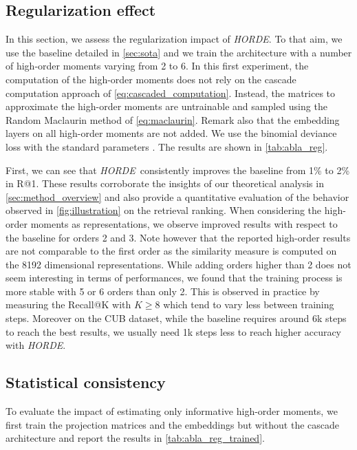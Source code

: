 \documentclass[10pt,twocolumn,letterpaper]{article}
\def\ourmethod{\textit{HORDE}}
\begin{document}
    \subsection{Regularization effect}\label{sec:abla_regul_power}
        In this section, we assess the regularization impact of \ourmethod.
        To that aim, we use the baseline detailed in \autoref{sec:sota} and we train the architecture with a number of high-order moments varying from 2 to 6.
        In this first experiment, the computation of the high-order moments does not rely on the cascade computation approach of \autoref{eq:cascaded_computation}.
        Instead, the matrices to approximate the high-order moments are untrainable and sampled using the Random Maclaurin method of \autoref{eq:maclaurin}.
        Remark also that the embedding layers on all high-order moments are not added.
        We use the binomial deviance loss with the standard parameters \cite{Ustinova_2016_NIPS}.
        The results are shown in \autoref{tab:abla_reg}.
        
        First, we can see that \ourmethod \ consistently improves the baseline from 1\% to 2\% in R@1.
        These results corroborate the insights of our theoretical analysis in \autoref{sec:method_overview} and also provide a quantitative evaluation of the behavior observed in \autoref{fig:illustration} on the retrieval ranking.
        When considering the high-order moments as representations, we observe improved results with respect to the baseline for orders 2 and 3.
        Note however that the reported high-order results are not comparable to the first order as the similarity measure is computed on the 8192 dimensional representations.
        While adding orders higher than 2 does not seem interesting in terms of performances, we found that the training process is more stable with 5 or 6 orders than only 2.
        This is observed in practice by measuring the Recall@K with $K \geq 8$ which tend to vary less between training steps.
        Moreover on the CUB dataset, while the baseline requires around 6k steps to reach the best results, we usually need 1k steps less to reach higher accuracy with \ourmethod.
    
    \subsection{Statistical consistency}\label{sec:abla_statistical_consistency}
        To evaluate the impact of estimating only informative high-order moments, we first train the projection matrices and the embeddings but without the cascade architecture and report the results in \autoref{tab:abla_reg_trained}.
        
\end{document}
